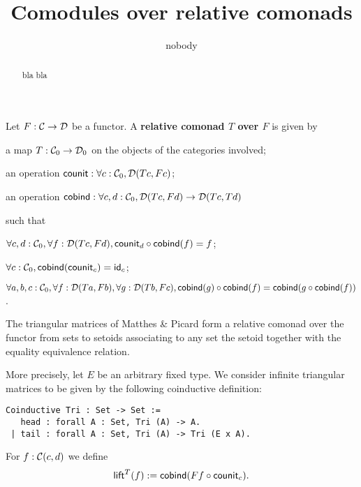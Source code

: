 \documentclass{amsart}
\author{nobody}
\title{Comodules over relative comonads}
\newcommand{\fat}[1]{\textbf{#1}}
\begin{document}
\begin{abstract}
  bla bla
\end{abstract}

\maketitle



\begin{definition}
  Let $F:\C\to\D$ be a functor. A \fat{relative comonad $T$ over $F$} is given by
  \begin{packitem}
   \item a map $T:\C_0 \to \D_0$ on the objects of the categories involved;
   \item an operation $\counit : \forall c : \C_0, \D(Tc,Fc)$;
   \item an operation $\cobind: \forall c,d:\C_0, \D(Tc,Fd) \to \D(Tc,Td)$
  \end{packitem}
  such that 
  \begin{packitem}
   \item $\forall c,d:\C_0, \forall f:\D(Tc,Fd), \comp{\cobind(f)}{\counit_d} = f$;
   \item $\forall c : \C_0, \cobind(\counit_c) = \id_c$;
   \item $\forall a,b,c:\C_0, \forall f : \D(Ta,Fb),\forall g:\D(Tb,Fc), \\
        \comp{\cobind(f)}{\cobind(g)} = \cobind(\comp{\cobind(f)}{g})$.
  \end{packitem} 
\end{definition}

\begin{example}
  The triangular matrices of Matthes \& Picard form a relative comonad over the functor from sets to setoids
  associating to any set the setoid together with the equality equivalence relation.
  
  More precisely, let $E$ be an arbitrary fixed type.
   We consider infinite triangular matrices to be given by the following coinductive definition:
  
  \begin{lstlisting}
Coinductive Tri : Set -> Set :=
   head : forall A : Set, Tri (A) -> A.
 | tail : forall A : Set, Tri (A) -> Tri (E x A).
  \end{lstlisting}

  
\end{example}


\begin{definition}
 For $f : \C(c,d)$ we define
  \[ \lift^T(f) := \cobind(\comp{\counit_c}{Ff}) .  \]
\end{definition}
\end{document}
